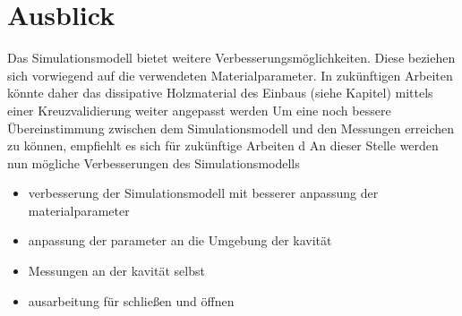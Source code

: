 \section{Ausblick}
Das Simulationsmodell bietet weitere Verbesserungsm\"oglichkeiten. Diese beziehen sich vorwiegend auf die verwendeten Materialparameter.
In zuk\"unftigen Arbeiten k\"onnte daher das dissipative Holzmaterial des Einbaus (siehe Kapitel) mittels einer Kreuzvalidierung weiter angepasst werden
Um eine noch bessere \"Ubereinstimmung zwischen dem Simulationsmodell und den Messungen erreichen zu k\"onnen, empfiehlt es sich f\"ur zuk\"unftige Arbeiten d
An dieser Stelle werden nun m\"ogliche Verbesserungen des Simulationsmodells 
\begin{itemize}
    \item verbesserung der Simulationsmodell mit besserer anpassung der materialparameter
    \item anpassung der parameter an die Umgebung der kavität
    \item Messungen an der kavität selbst
    \item ausarbeitung für schließen und öffnen
\end{itemize}